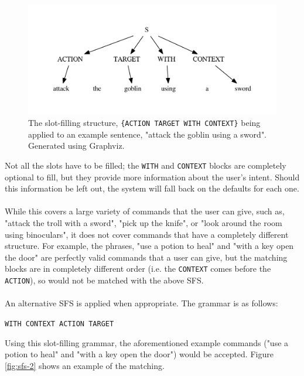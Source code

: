 \documentclass[11pt]{article}
\begin{document}
\begin{center}
\begin{figure}[H]
\begin{center}
  \includegraphics[width=\linewidth]{sfs-1.pdf}
  \caption{The slot-filling structure, \texttt{\{ACTION TARGET WITH CONTEXT\}} being applied to an example sentence, "attack the goblin using a sword". Generated using Graphviz.}
  \label{fig:sfs-1}
  \end{center}
\end{figure}
\end{center}

Not all the slots have to be filled; the \texttt{WITH} and \texttt{CONTEXT} blocks are completely optional to fill, but they provide more information about the user's intent. Should this information be left out, the system will fall back on the defaults for each one.
\\
\\
While this covers a large variety of commands that the user can give, such as, "attack the troll with a sword", "pick up the knife", or "look around the room using binoculars", it does not cover commands that have a completely different structure. For example, the phrases, "use a potion to heal" and "with a key open the door" are perfectly valid commands that a user can give, but the matching blocks are in completely different order (i.e. the \texttt{CONTEXT} comes before the \texttt{ACTION}), so would not be matched with the above SFS.
\\
\\
An alternative SFS is applied when appropriate. The grammar is as follows:

\begin{center}
\texttt{WITH CONTEXT ACTION TARGET}
\end{center}

Using this slot-filling grammar, the aforementioned example commands ("use a potion to heal" and "with a key open the door") would be accepted. Figure \ref{fig:sfs-2} shows an example of the matching.
\end{document}
